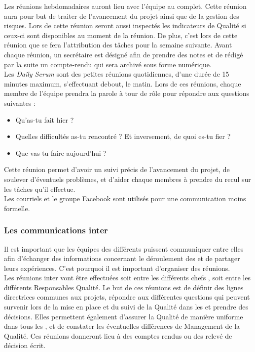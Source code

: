 Les réunions hebdomadaires auront lieu avec l’équipe au complet. Cette réunion aura pour but de traiter de l’avancement du projet ainsi que de la gestion des risques. Lors de cette réunion seront aussi inspectés les indicateurs de Qualité si ceux-ci sont disponibles au moment de la réunion. De plus, c’est lors de cette réunion que se fera l’attribution des tâches pour la semaine suivante. Avant chaque réunion, un secrétaire est désigné afin de prendre des notes et de rédigé par la suite un compte-rendu qui sera archivé sous forme numérique.\\

Les \textit{Daily Scrum} sont des petites réunions quotidiennes, d’une durée de 15 minutes maximum, s’effectuant debout, le matin. Lors de ces réunions, chaque membre de l’équipe prendra la parole à tour de rôle pour répondre aux questions suivantes :
\begin{itemize}
\item Qu’as-tu fait hier ?
\item Quelles difficultés as-tu rencontré ? Et inversement, de quoi es-tu fier ?
\item Que vas-tu faire aujourd’hui ?
\end{itemize}
Cette réunion permet d’avoir un suivi précis de l’avancement du projet, de soulever d'éventuels problèmes, et d’aider chaque membres à prendre du recul sur les tâches qu’il effectue.\\

Les courriels et le groupe Facebook sont utilisés pour une communication moins formelle. 

\subsubsection*{Les communications inter\picCourt{}}  

Il est important que les équipes des différents \PICCourt puissent communiquer entre elles afin d’échanger des informations concernant le déroulement des \PICCourt et de partager leurs expériences. C'est pourquoi il est important d'organiser des réunions.\\

Les réunions inter\PICCourt{} vont être effectuées soit entre les différents chefs \PICCourt{}, soit entre les différents Responsables Qualité. Le but de ces réunions est de définir des lignes directrices communes aux projets, répondre aux différentes questions qui peuvent survenir lors de la mise en place et du
suivi de la Qualité dans les \PICCourt et prendre des décisions. Elles permettent également d’assurer la Qualité de manière uniforme dans tous les \PICCourt, et de constater les éventuelles différences de Management de la Qualité. Ces réunions donneront lieu à des comptes rendus ou des relevé de décision écrit.

